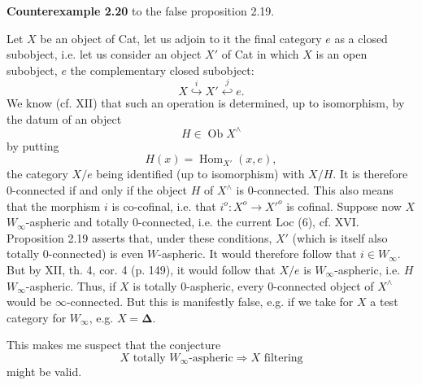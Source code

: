 \documentclass[11pt]{article}
\newcommand{\printedpage}[1]{\marginpar{\footnotesize p.~#1}}
\newcommand{\msp}[1]{\marginpar{\footnotesize [#1]}}
\newcommand{\Hom}{\operatorname{Hom}}
\newcommand{\Ob}{\operatorname{Ob}}
\begin{document}
\msp{page 36bis}
\noindent\textbf{Counterexample 2.20} to the false proposition 2.19.

Let $X$ be an object of Cat, let us adjoin to it the final category $e$ as a closed subobject, i.e. let us consider an object $X'$ of Cat in which $X$ is an open subobject, $e$ the complementary closed subobject:
\[
X \overset{i}{\hookrightarrow} X' \overset{j}{\hookleftarrow} e.
\]
We know (cf. XII) that such an operation is determined, up to isomorphism, by the datum of an object
\[
H \in \Ob X^\wedge
\]
by putting
\[
H(x) = \Hom_{X'}(x,e),
\]
the category $X/e$ being identified (up to isomorphism) with $X/H$. It is therefore 0-connected if and only if the object $H$ of $X^\wedge$ is 0-connected. This also means that the morphism $i$ is co-cofinal, i.e. that $i^o : X^o \longrightarrow X'^o$ is cofinal. Suppose now $X$ $W_\infty$-aspheric and totally 0-connected, i.e. the current Loc (6), cf. XVI. Proposition 2.19 asserts that, under these conditions, $X'$ (which is itself also totally 0-connected) is even $W$-aspheric. It would therefore follow that $i \in W_\infty$. But by XII, th. 4, cor. 4 (p. 149), it would follow that
\printedpage{23}
\msp{page 36ter}
$X/e$ is $W_\infty$-aspheric, i.e. $H$ $W_\infty$-aspheric. Thus, if $X$ is totally 0-aspheric, every 0-connected object of $X^\wedge$ would be $\infty$-connected. But this is manifestly false, e.g. if we take for $X$ a test category for $W_\infty$, e.g. $X = \boldsymbol{\Delta}$.

This makes me suspect that the conjecture
\[
X \text{ totally } W_\infty\text{-aspheric} \Longrightarrow X \text{ filtering}
\]
might be valid.
\end{document}
